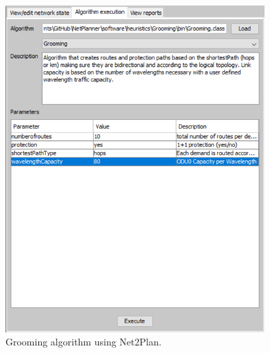 \begin{figure}[h!]
\centering
\includegraphics[width=10cm]{sdf/heuristic/figures/grooming}
\caption{Grooming algorithm using Net2Plan.}
\label{grooming}
\end{figure}